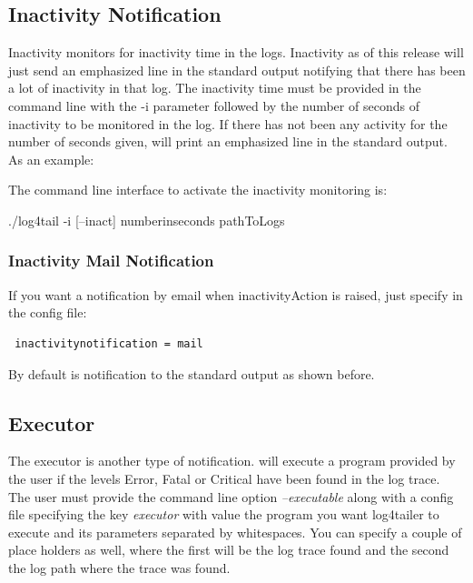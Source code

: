 \subsection{Inactivity Notification}
\label{sec:inactivitysection}
Inactivity monitors for inactivity time in the logs. Inactivity as of this
release will just send an emphasized line in the standard output notifying that
there has been a lot of inactivity in that log. The inactivity time must be
provided in the command line with the -i parameter followed by the number of
seconds of inactivity to be monitored in the log.  If there has not been any
activity for the number of seconds given, \logftailer{} will print an
emphasized line in the standard output.\\ 
As an example:\\
 
The command line interface to activate the inactivity monitoring is:
\begin{cmd}
 ./log4tail -i [--inact] numberinseconds pathToLogs
\end{cmd}

\subsubsection{Inactivity Mail Notification}
If you want a notification by email when inactivityAction is raised, just specify in the 
config file:

\begin{config}
\begin{verbatim}
 inactivitynotification = mail
\end{verbatim}
\end{config}

\noindent
By default is notification to the standard output as shown before. 

\subsection{Executor}
\label{sec:executor}

The executor is another type of notification. \logftailer{} will execute a
program provided by the user if the levels Error, Fatal or Critical have been
found in the log trace. The user must provide the command line option
\emph{--executable} along with a config file specifying the key \emph{executor}
with value the program you want log4tailer to execute and its parameters
separated by whitespaces. You can specify a couple of place holders as well,
where the first will be the log trace found and the second the log path where
the trace was found.

